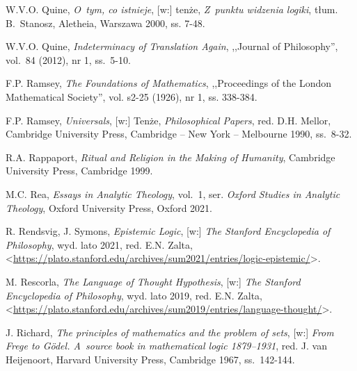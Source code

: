 \begin{thebibliography}{100}
W.V.O. Quine, \textit{O~tym, co istnieje}, [w:] tenże, \textit{Z~punktu widzenia logiki}, tłum. B.~Stanosz, Aletheia, Warszawa 2000, ss. 7-48.

W.V.O. Quine, \textit{Indeterminacy of Translation Again}, ,,Journal of Philosophy'', vol.~84 (2012), nr 1, ss.~5-10.

F.P. Ramsey, \textit{The Foundations of Mathematics}, ,,Proceedings of the London Mathematical Society'', vol. s2-25 (1926), nr 1, ss. 338-384.

F.P. Ramsey, \textit{Universals}, [w:] Tenże, \textit{Philosophical Papers}, red. D.H. Mellor, Cambridge University Press, Cambridge -- New York -- Melbourne 1990, ss.~8-32.

R.A. Rappaport, \textit{Ritual and Religion in the Making of Humanity}, Cambridge University Press, Cambridge 1999.

M.C. Rea, \textit{Essays in Analytic Theology}, vol.~1, ser. \textit{Oxford Studies in Analytic Theology},
Oxford University Press,  Oxford 2021.





R. Rendsvig, J. Symons, \textit{Epistemic Logic}, [w:] \textit{The Stanford Encyclopedia of Philosophy},
wyd. lato 2021, red. E.N. Zalta, <\url{https://plato.stanford.edu/archives/sum2021/entries/logic-epistemic/}>.

M. Rescorla, \textit{The Language of Thought Hypothesis}, [w:] \textit{The Stanford Encyclopedia of Philosophy},
wyd. lato 2019, red. E.N. Zalta, <\url{https://plato.stanford.edu/archives/sum2019/entries/language-thought/}>.

J. Richard, \textit{The principles of mathematics and the problem of sets},
[w:] \textit{From Frege to Gödel. A~source book in mathematical logic 1879–1931}, red. J. van Heijenoort, Harvard University Press, Cambridge 1967, ss.~142-144.


\end{thebibliography}

